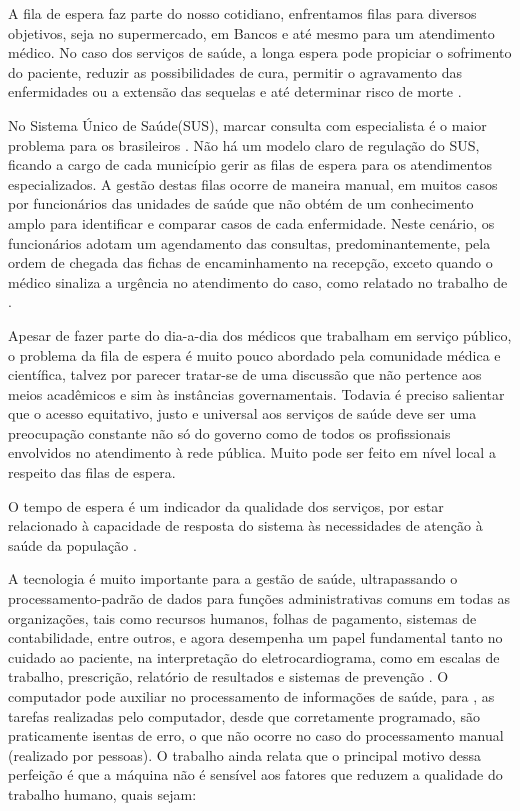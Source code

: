 A fila de espera faz parte do nosso cotidiano, enfrentamos filas para diversos objetivos, seja no supermercado, em Bancos e até mesmo para um atendimento médico. No caso dos serviços de saúde, a longa espera pode propiciar o sofrimento do paciente, reduzir as possibilidades de cura, permitir o agravamento das enfermidades ou a extensão das sequelas e até determinar risco de morte \cite{Gazzinelli2014}. 

No Sistema Único de Saúde(SUS), marcar consulta com especialista é o maior problema para os brasileiros \cite{CFM2018}. Não há um modelo claro de regulação do SUS, ficando a cargo de cada município gerir as filas de espera para os atendimentos especializados. A gestão destas filas ocorre de maneira manual, em muitos casos por funcionários das unidades de saúde que não obtém de um conhecimento  amplo para identificar e comparar casos de cada enfermidade. Neste cenário, os funcionários adotam um agendamento das consultas, predominantemente, pela ordem de chegada das fichas de encaminhamento na recepção, exceto quando o médico sinaliza a urgência no atendimento do caso, como relatado no trabalho de \cite{SOUZA2014}.

Apesar de fazer parte do dia-a-dia dos médicos que trabalham em serviço público, o problema da fila de espera é muito pouco abordado pela comunidade médica e científica, talvez por parecer tratar-se de uma discussão que não pertence aos meios acadêmicos e sim às instâncias governamentais. Todavia é preciso salientar que o acesso equitativo, justo e universal aos serviços de saúde deve ser uma preocupação constante não só do governo como de todos os profissionais envolvidos no atendimento à rede pública. Muito pode ser feito em nível local a respeito das filas de espera. \cite{KRISHNAMURTI2005}

O tempo de espera é um indicador da qualidade dos serviços, por estar relacionado à capacidade de resposta do sistema às necessidades de atenção à saúde da população \cite{Gazzinelli2014}. 

A tecnologia é muito importante para a gestão de saúde,
ultrapassando o processamento-padrão de dados para funções administrativas comuns em todas as organizações, tais como recursos humanos, folhas de pagamento, sistemas de contabilidade, entre outros, e agora desempenha um papel fundamental tanto no cuidado ao paciente, na interpretação do eletrocardiograma, como em escalas de trabalho, prescrição, relatório de resultados e sistemas de prevenção \cite{PINOCHET2014}. O computador pode auxiliar no processamento de informações de saúde, para \cite{MATTOS1978}, as tarefas realizadas pelo computador, desde que corretamente programado, são praticamente isentas de erro, o que não ocorre no caso do processamento manual (realizado por pessoas). O trabalho ainda relata que o principal motivo dessa perfeição é que a máquina não é sensível aos fatores que reduzem a qualidade do trabalho humano, quais sejam:

